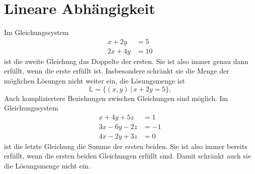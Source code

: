 %
%
%
\section{Lineare Abhängigkeit%
\label{skript:section:linabh}}
Im Gleichungssystem
\begin{align*}
x+2y&=5\\
2x+4y&=10
\end{align*}
ist die zweite Gleichung das Doppelte der ersten.
Sie ist also immer genau dann erfüllt, wenn die erste erfüllt ist.
Insbesondere schränkt sie die Menge der möglichen Lösungen
nicht weiter ein, die Lösungsmenge ist
\[
\mathbb L=\{(x,y)\,|\, x+2y=5\}.
\]
Auch kompliziertere Beziehungen zwischen Gleichungen sind
möglich.
Im Gleichungssystem
\begin{align*}
 x+4y+5z&=1\\
3x-6y-2z&=-1\\
4x-2y+3z&=0
\end{align*}
ist die letzte Gleichung die Summe der ersten beiden.
Sie ist also
immer bereits erfüllt, wenn die ersten beiden Gleichungen erfüllt
sind.
Damit schränkt auch sie die Lösungsmenge nicht ein.

